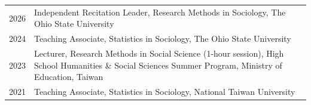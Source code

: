 

\begin{longtable}[l]{@{}p{} p{}}

    2026 & Independent Recitation Leader, Research Methods in Sociology, The Ohio State University \\
    
    2024 & Teaching Associate, Statistics in Sociology, The Ohio State University \\

    2023 & Lecturer, Research Methods in Social Science (1-hour session), High School Humanities \& Social Sciences Summer Program, Ministry of Education, Taiwan \\

    2021 & Teaching Associate, Statistics in Sociology, National Taiwan University \\


\end{longtable}